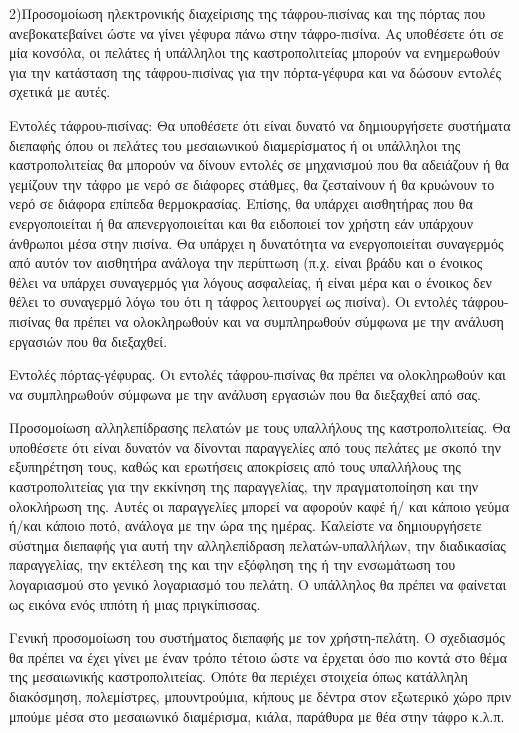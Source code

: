 \documentclass{assignment}
\begin{document}
2)Προσομοίωση ηλεκτρονικής διαχείρισης της τάφρου-πισίνας και της πόρτας που ανεβοκατεβαίνει ώστε να γίνει γέφυρα πάνω στην τάφρο-πισίνα. Ας υποθέσετε ότι σε μία κονσόλα, οι πελάτες ή υπάλληλοι της καστροπολιτείας μπορούν να ενημερωθούν για την κατάσταση της τάφρου-πισίνας για την πόρτα-γέφυρα και να δώσουν εντολές σχετικά με αυτές.

Εντολές τάφρου-πισίνας: Θα υποθέσετε ότι είναι δυνατό να δημιουργήσετε συστήματα διεπαφής όπου οι πελάτες του μεσαιωνικού διαμερίσματος ή οι υπάλληλοι της καστροπολιτείας θα μπορούν να δίνουν εντολές σε μηχανισμού που θα αδειάζουν ή θα γεμίζουν την τάφρο με νερό σε διάφορες στάθμες, θα ζεσταίνουν ή θα κρυώνουν το νερό σε διάφορα επίπεδα θερμοκρασίας. Επίσης, θα υπάρχει αισθητήρας που θα ενεργοποιείται ή θα απενεργοποιείται και θα ειδοποιεί τον χρήστη εάν υπάρχουν άνθρωποι μέσα στην πισίνα. Θα υπάρχει η δυνατότητα να ενεργοποιείται συναγερμός από αυτόν τον αισθητήρα ανάλογα την περίπτωση (π.χ. είναι βράδυ και ο ένοικος θέλει να υπάρχει συναγερμός για λόγους ασφαλείας, ή είναι μέρα και ο ένοικος δεν θέλει το συναγερμό λόγω του ότι η τάφρος λειτουργεί ως πισίνα). Οι εντολές τάφρου-πισίνας θα πρέπει να ολοκληρωθούν και να συμπληρωθούν σύμφωνα με την ανάλυση εργασιών που θα διεξαχθεί.

Εντολές πόρτας-γέφυρας. Οι εντολές τάφρου-πισίνας θα πρέπει να ολοκληρωθούν και να συμπληρωθούν σύμφωνα με την ανάλυση εργασιών που θα διεξαχθεί από σας.


Προσομοίωση αλληλεπίδρασης πελατών με τους υπαλλήλους της καστροπολιτείας. Θα υποθέσετε ότι είναι δυνατόν να δίνονται παραγγελίες από τους πελάτες με σκοπό την εξυπηρέτηση τους, καθώς και ερωτήσεις αποκρίσεις από τους υπαλλήλους της καστροπολιτείας για την εκκίνηση της παραγγελίας, την πραγματοποίηση και την ολοκλήρωση της. Αυτές οι παραγγελίες μπορεί να αφορούν καφέ ή/ και κάποιο γεύμα ή/και κάποιο ποτό, ανάλογα με την ώρα της ημέρας. Καλείστε να δημιουργήσετε σύστημα διεπαφής για αυτή την αλληλεπίδραση πελατών-υπαλλήλων, την διαδικασίας παραγγελίας, την εκτέλεση της και την εξόφληση της ή την ενσωμάτωση του λογαριασμού στο γενικό λογαριασμό του πελάτη. Ο υπάλληλος θα πρέπει να φαίνεται ως εικόνα ενός ιππότη ή μιας πριγκίπισσας. 

Γενική προσομοίωση του συστήματος διεπαφής με τον χρήστη-πελάτη. Ο σχεδιασμός θα πρέπει να έχει γίνει με έναν τρόπο τέτοιο ώστε να έρχεται όσο πιο κοντά στο θέμα της μεσαιωνικής καστροπολιτείας. Οπότε θα περιέχει στοιχεία όπως κατάλληλη διακόσμηση, πολεμίστρες, μπουντρούμια, κήπους με δέντρα στον εξωτερικό χώρο πριν μπούμε μέσα στο μεσαιωνικό διαμέρισμα, κιάλα, παράθυρα με θέα στην τάφρο κ.λ.π. 
\end{document}
